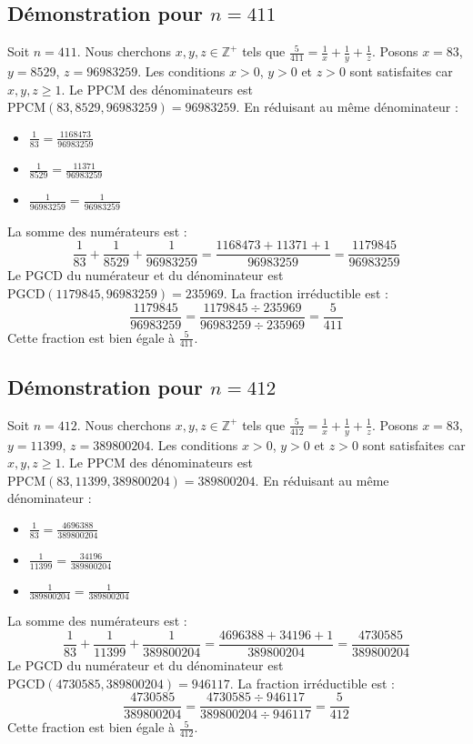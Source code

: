 \documentclass[11pt,a4paper]{article}
\begin{document}
\subsection{Démonstration pour $n = 411$}
Soit $n = 411$. Nous cherchons $x, y, z \in \mathbb{Z}^{+}$ tels que $\frac{5}{411} = \frac{1}{x} + \frac{1}{y} + \frac{1}{z}$.
Posons $x = 83$, $y = 8529$, $z = 96983259$.
Les conditions $x > 0$, $y > 0$ et $z > 0$ sont satisfaites car $x, y, z \geq 1$.
Le PPCM des dénominateurs est $\text{PPCM}(83, 8529, 96983259) = 96983259$.
En réduisant au même dénominateur :
\begin{itemize}
    \item $\frac{1}{83} = \frac{1168473}{96983259}$
    \item $\frac{1}{8529} = \frac{11371}{96983259}$
    \item $\frac{1}{96983259} = \frac{1}{96983259}$
\end{itemize}
La somme des numérateurs est :
$$ \frac{1}{83} + \frac{1}{8529} + \frac{1}{96983259} = \frac{1168473 + 11371 + 1}{96983259} = \frac{1179845}{96983259} $$
Le PGCD du numérateur et du dénominateur est $\text{PGCD}(1179845, 96983259) = 235969$.
La fraction irréductible est :
$$ \frac{1179845}{96983259} = \frac{1179845 \div 235969}{96983259 \div 235969} = \frac{5}{411} $$
Cette fraction est bien égale à $\frac{5}{411}$.

\subsection{Démonstration pour $n = 412$}
Soit $n = 412$. Nous cherchons $x, y, z \in \mathbb{Z}^{+}$ tels que $\frac{5}{412} = \frac{1}{x} + \frac{1}{y} + \frac{1}{z}$.
Posons $x = 83$, $y = 11399$, $z = 389800204$.
Les conditions $x > 0$, $y > 0$ et $z > 0$ sont satisfaites car $x, y, z \geq 1$.
Le PPCM des dénominateurs est $\text{PPCM}(83, 11399, 389800204) = 389800204$.
En réduisant au même dénominateur :
\begin{itemize}
    \item $\frac{1}{83} = \frac{4696388}{389800204}$
    \item $\frac{1}{11399} = \frac{34196}{389800204}$
    \item $\frac{1}{389800204} = \frac{1}{389800204}$
\end{itemize}
La somme des numérateurs est :
$$ \frac{1}{83} + \frac{1}{11399} + \frac{1}{389800204} = \frac{4696388 + 34196 + 1}{389800204} = \frac{4730585}{389800204} $$
Le PGCD du numérateur et du dénominateur est $\text{PGCD}(4730585, 389800204) = 946117$.
La fraction irréductible est :
$$ \frac{4730585}{389800204} = \frac{4730585 \div 946117}{389800204 \div 946117} = \frac{5}{412} $$
Cette fraction est bien égale à $\frac{5}{412}$.
\end{document}
